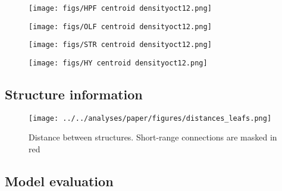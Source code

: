 \begin{figure}[H]
    \centering
    \texttt{[image: figs/HPF centroid densityoct12.png]} 
    \label{fig:my_label}
\end{figure}
\newpage

\begin{figure}[H]
    \centering
    \texttt{[image: figs/OLF centroid densityoct12.png]} 
    \label{fig:my_label}
\end{figure}
\newpage

\begin{figure}[H]
    \centering
    \texttt{[image: figs/STR centroid densityoct12.png]} 
    \label{fig:my_label}
\end{figure}
\newpage

\begin{figure}[H]
    \centering
    \texttt{[image: figs/HY centroid densityoct12.png]} 
    \label{fig:my_label}
\end{figure}

\newpage
\subsection{Structure information}

\begin{figure}[H]
    \centering
    \texttt{[image: ../../analyses/paper/figures/distances\_leafs.png]} 
    \label{fig:distances}
    \caption{Distance between structures.  Short-range connections are masked in red}
\end{figure}

\subsection{Model evaluation}
\label{supp_sec:model-evaluation}


